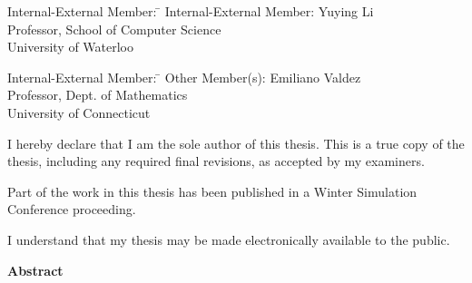   \noindent
\begin{tabbing}
Internal-External Member: \=  \kill %
Internal-External Member: \> Yuying Li \\
\> Professor, School of Computer Science \\
\> University of Waterloo \\
\end{tabbing}
  \bigskip
  
  \noindent
\begin{tabbing}
Internal-External Member: \=  \kill %
Other Member(s): \>  Emiliano Valdez \\
\> Professor, Dept. of Mathematics \\
\> University of Connecticut \\
\end{tabbing}

\cleardoublepage

  \noindent
I hereby declare that I am the sole author of this thesis. This is a true copy of the thesis, including any required final revisions, as accepted by my examiners.

\bigskip
  
\noindent
Part of the work in this thesis has been published in a Winter Simulation Conference proceeding.

  \bigskip
  
  \noindent
I understand that my thesis may be made electronically available to the public.

\cleardoublepage


\begin{center}\textbf{Abstract}\end{center}

